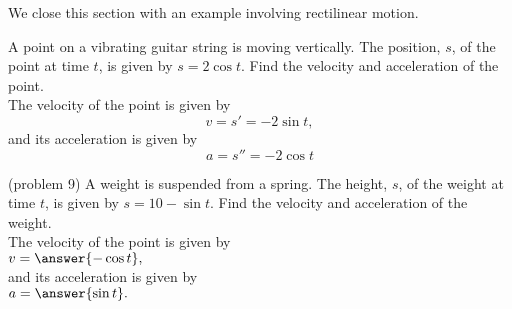 \documentclass[handout]{ximera}
\begin{document}
We close this section with an example involving rectilinear motion.

\begin{example}
A point on a vibrating guitar string is moving vertically.
The position, $s$, of the point at time $t$, is given by $s = 2\cos t$.  Find the velocity and acceleration of the point.\\
The velocity of the point is given by 
\[
v = s' = -2\sin t,
\]
and its acceleration is given by 
\[
a = s'' = -2\cos t
\]

\end{example}

\begin{problem}(problem 9)
A weight is suspended from a spring.
The height, $s$, of the weight at time $t$, is given by $s = 10-\sin t$.  Find the velocity and acceleration of the weight.\\
The velocity of the point is given by\\
 $v = \answer{ -\cos t},$ \\
and its acceleration is given by\\
 $a = \answer{\sin t}.$
\end{problem}
\end{document}
